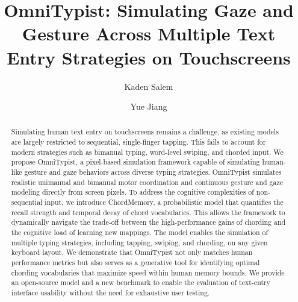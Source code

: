 \documentclass[sigconf,review,anonymous]{acmart}
\begin{document}
\title[]{OmniTypist: Simulating Gaze and Gesture Across Multiple Text Entry Strategies on Touchscreens}

\author{Kaden Salem}
\orcid{}


\author{Yue Jiang}



\renewcommand{\shortauthors}{}

\begin{abstract}
Simulating human text entry on touchscreens remains a challenge, as existing models are largely restricted to sequential, single-finger tapping. This fails to account for modern strategies such as bimanual typing, word-level swiping, and chorded input. We propose OmniTypist, a pixel-based simulation framework capable of simulating human-like gesture and gaze behaviors across diverse typing strategies.
OmniTypist simulates realistic unimanual and bimanual motor coordination and continuous gesture and gaze modeling directly from screen pixels. To address the cognitive complexities of non-sequential input, we introduce ChordMemory, a probabilistic model that quantifies the recall strength and temporal decay of chord vocabularies. This allows the framework to dynamically navigate the trade-off between the high-performance gains of chording and the cognitive load of learning new mappings.
The model enables the simulation of multiple typing strategies, including tapping, swiping, and chording, on any given keyboard layout. We demonstrate that OmniTypist not only matches human performance metrics but also serves as a generative tool for identifying optimal chording vocabularies that maximize speed within human memory bounds. We provide an open-source model and a new benchmark to enable the evaluation of text-entry interface usability without the need for exhaustive user testing.
\end{abstract}
\end{document}
